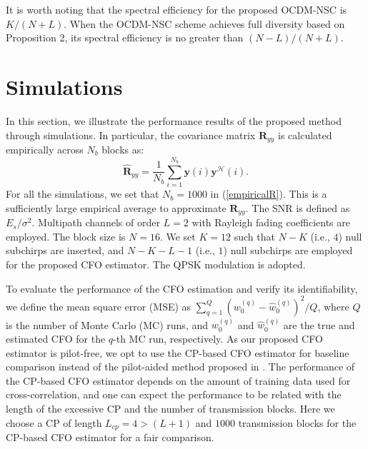 \documentclass[journal]{IEEEtran}
\begin{document}
It is worth noting that the spectral efficiency for the proposed OCDM-NSC is \(K/(N+L)\). When the OCDM-NSC scheme achieves full diversity based on Proposition 2, its spectral efficiency is no greater than \((N-L)/(N+L)\).

\section{Simulations}
In this section, we illustrate the performance results of the proposed method through simulations. In particular, the covariance matrix \(\mathbf{R}_{yy}\) is calculated empirically across \(N_b\) blocks as:
\begin{equation} \label{empiricalR}
    \hat{\mathbf{R}}_{yy}=\frac{1}{N_b}\sum_{i=1}^{N_b}\mathbf{y}(i)\mathbf{y}^\mathcal{H}(i).
\end{equation} 
For all the simulations, we set that $N_b = 1000$ in (\ref{empiricalR}). This is a sufficiently large empirical average to approximate \(\mathbf{R}_{yy}\). The SNR is defined as \(E_s/\sigma^2\). Multipath channels of order \(L=2\) with Rayleigh fading coefficients are employed. The block size is \(N=16\). We set \(K=12\) such that $N-K$ (i.e., \(4\)) null subchirps are inserted, and \(N-K-L-1\) (i.e., \(1\)) null subchirps are employed for the proposed CFO estimator. The QPSK modulation is adopted. 



To evaluate the performance of the CFO estimation and verify its identifiability, we define the mean square error (MSE) as \(\sum_{q=1}^{Q}(w_{0}^{(q)}-\hat{w}_{0}^{(q)})^2/Q\), where \(Q\) is the number of Monte Carlo (MC) runs, and $w_{0}^{(q)}$ and $\hat{w}_{0}^{(q)}$ are the true and estimated CFO for the $q$-th MC run, respectively. 
As our proposed CFO estimator is pilot-free, we opt to use the CP-based CFO estimator \cite{zhang_channel_2022} for baseline comparison instead of the pilot-aided method proposed in \cite{filomeno_joint_2022}. The performance of the CP-based CFO estimator depends on the amount of training data used for cross-correlation, and one can expect the performance to be related with the length of the excessive CP and the number of transmission blocks.
Here we choose a CP of length \(L_{cp} = 4 > (L+1)\) and 
\(1000\) transmission blocks for the CP-based CFO estimator for a fair comparison.  %
\end{document}
